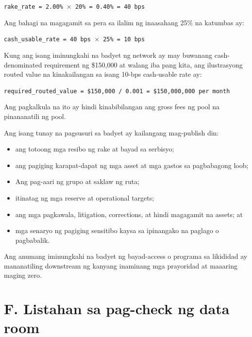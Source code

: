 \documentclass[11pt]{article}
\begin{document}
\texttt{rake\_rate = 2.00\% $\times$ 20\% = 0.40\% = 40 bps}

Ang bahagi na magagamit sa pera sa ilalim ng inaasahang 25\% na katumbas ay:

\texttt{cash\_usable\_rate = 40 bps $\times$ 25\% = 10 bps}

Kung ang isang iminungkahi na badyet ng network ay may buwanang cash-denominated requirement ng \$150,000 at walang iba pang kita, ang ilustrasyong routed value na kinakailangan sa isang 10-bps cash-usable rate ay:

\texttt{required\_routed\_value = \$150,000 / 0.001 = \$150,000,000 per month}

Ang pagkalkula na ito ay hindi kinabibilangan ang gross fees ng pool na pinananatili ng pool.

Ang isang tunay na pagsusuri sa badyet ay kailangang mag-publish din:

\begin{itemize}[leftmargin=*]
\item ang totoong mga resibo ng rake at bayad sa serbisyo;
\item ang pagiging karapat-dapat ng mga asset at mga gastos sa pagbabagong loob;
\item Ang pag-aari ng grupo at saklaw ng ruta;
\item itinatag ng mga reserve at operational targets;
\item ang mga pagkawala, litigation, corrections, at hindi magagamit na assets; at
\item mga senaryo ng pagiging sensitibo kaysa sa ipinangako na paglago o pagbabalik.
\end{itemize}
Ang anumang iminungkahi na badyet ng bayad-access o programa sa likididad ay mananatiling downstream ng kanyang inaminang mga prayoridad at maaaring maging zero.


\section*{F. Listahan sa pag-check ng data room}
\end{document}
